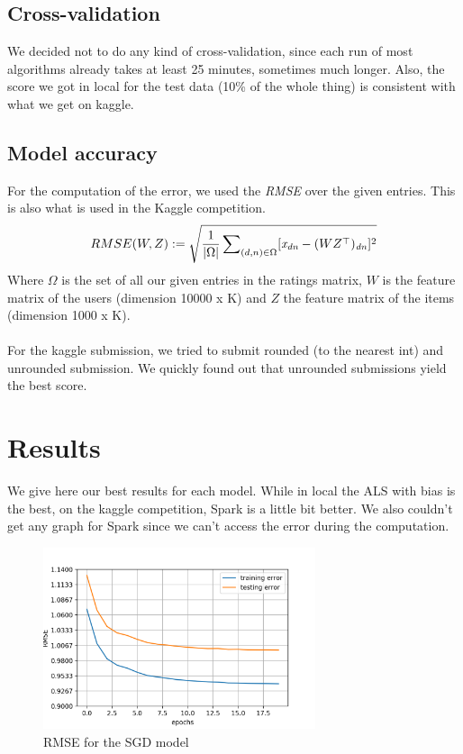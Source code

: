 \documentclass[a4paper]{article}
\begin{document}
\subsection{Cross-validation}
We decided not to do any kind of cross-validation, since each run of most algorithms already takes at least 25 minutes, sometimes much longer.
Also, the score we got in local for the test data (10\% of the whole thing) is consistent with what we get on kaggle.

\subsection{Model accuracy}
For the computation of the error, we used the \textit{RMSE} over the given entries. This is also what is used in the Kaggle competition.  
$$ RMSE(W, Z) := \sqrt{\frac{1}{|\Omega|} \sum\nolimits_{(d, n) \in \Omega} [\textit{x\textsubscript{dn}} - (WZ^\top)\textsubscript{\textit{dn}}]^2} $$
Where \(\Omega\) is the set of all our given entries in the ratings matrix, \(W\) is the feature matrix of the users (dimension 10000 x K) and \(Z\) the feature matrix of the items (dimension 1000 x K).
\paragraph{}
For the kaggle submission, we tried to submit rounded (to the nearest int) and unrounded submission. We quickly found out that unrounded submissions yield the best score.




\section{Results}
We give here our best results for each model.
While in local the ALS with bias is the best, on the kaggle competition, Spark is a little bit better. We also couldn't get any graph for Spark since we can't access the error during the computation.
\mbox{}\\
\begin{figure}[h]
  \centering
  \includegraphics[width=8cm]{RMSE_SGD.png}
  \caption{RMSE for the SGD model}
  \label{fig:figure 2}
\end{figure}
\end{document}
